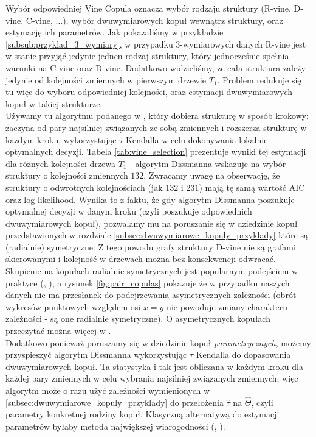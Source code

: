 Wybór odpowiedniej Vine Copula oznacza wybór rodzaju struktury (R-vine, D-vine, C-vine, $\dots$), wybór dwuwymiarowych kopuł wewnątrz struktury, oraz estymację ich parametrów. Jak pokazaliśmy w przykładzie \ref{subsub:przyklad_3_wymiary}, w przypadku $3$-wymiarowych danych R-vine jest w stanie przyjąć jedynie jednen rodzaj struktury, który jednocześnie spełnia warunki na C-vine oraz D-vine. Dodatkowo widzieliśmy, że cała struktura zależy jedynie od kolejności zmiennych w pierwszym drzewie $T_1$.  Problem redukuje się tu więc do wyboru odpowiedniej kolejności, oraz estymacji dwuwymiarowych kopuł w takiej strukturze.\\
Używamy tu algorytmu podanego w \cite{Dissmann_Vines}, który dobiera strukturę w sposób krokowy: zaczyna od pary najsilniej związanych ze sobą zmiennych i rozszerza strukturę w każdym kroku, wykorzystując $\tau$ Kendalla w celu dokonywania lokalnie optymalnych decyzji. Tabela \ref{tab:vine_selection} prezentuje wyniki tej estymacji dla różnych kolejności drzewa $T_1$ - algorytm Dissmanna wskazuje na wybór struktury o kolejności zmiennych $132$. Zwracamy uwagę na obserwację, że struktury o odwrotnych kolejnościach (jak $132$ i $231$) mają tę samą wartość AIC oraz log-likelihood. Wynika to z faktu, że gdy algorytm Dissmanna poszukuje optymalnej decyzji w danym kroku (czyli poszukuje odpowiednich dwuwymiarowych kopuł), pozwalamy mu na poruszanie się w dziedzinie kopuł przedstawionych w rozdziale \ref{subsec:dwuwymiarowe_kopuly_przyklady} które są (radialnie) symetryczne. Z tego powodu grafy struktury D-vine nie są grafami skierowanymi i kolejność w drzewach można bez konsekwencji odwracać. Skupienie na kopułach radialnie symetrycznych jest popularnym podejściem w praktyce (\cite{Cherubini_Copula_Methods_in_Finance}, \cite{Czado_Vine_Copulas}), a rysunek \ref{fig:pair_copulas} pokazuje że w przypadku naszych danych nie ma przesłanek do podejrzewania asymetrycznych zależności (obrót wykresów punktowych względem osi $x=y$ nie powoduje zmiany charakteru zależności - są one radialnie symetryczne). O asymetrycznych kopułach przeczytać można więcej w \cite{BedfordCooke2002}.\\
Dodatkowo ponieważ poruszamy się w dziedzinie kopuł \emph{parametrycznych}, możemy przyspieszyć algorytm Dissmanna wykorzystując $\tau$ Kendalla do dopasowania dwuwymiarowych kopuł. Ta statystyka i tak jest obliczana w każdym kroku dla każdej pary zmiennych w celu wybrania najsilniej związanych zmiennych, więc algorytm może o razu użyć zależności wymienionych w \ref{subsec:dwuwymiarowe_kopuly_przyklady} do przełożenia $\hat{\tau}$ na $\hat{\Theta}$, czyli parametry konkretnej rodziny kopuł. Klasyczną alternatywą do estymacji parametrów byłaby metoda największej wiarogodności (\cite{BedfordCooke2002}, \cite{Czado_Vine_Copulas}).\\

